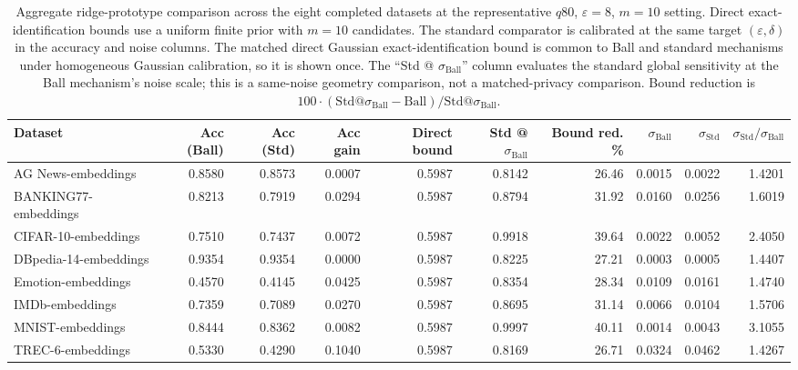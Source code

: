 \documentclass[conference,compsoc]{IEEEtran}
\begin{document}
\begin{table}[t]
\centering
\caption{Aggregate ridge-prototype comparison across the eight completed datasets at the representative $q80$, $\varepsilon=8$, $m=10$ setting. Direct exact-identification bounds use a uniform finite prior with $m=10$ candidates. The standard comparator is calibrated at the same target $(\varepsilon,\delta)$ in the accuracy and noise columns. The matched direct Gaussian exact-identification bound is common to Ball and standard mechanisms under homogeneous Gaussian calibration, so it is shown once. The ``Std @ $\sigma_{\mathrm{Ball}}$'' column evaluates the standard global sensitivity at the Ball mechanism's noise scale; this is a same-noise geometry comparison, not a matched-privacy comparison. Bound reduction is $100\cdot(\mathrm{Std@}\sigma_{\mathrm{Ball}}-\mathrm{Ball})/\mathrm{Std@}\sigma_{\mathrm{Ball}}$.}
\label{tab:aggregate-summary}
\scriptsize
\setlength{\tabcolsep}{3.5pt}
\begin{tabular}{lrrrrrrrrr}
\toprule
Dataset
& Acc (Ball)
& Acc (Std)
& Acc gain
& Direct bound
& Std @ $\sigma_{\mathrm{Ball}}$
& Bound red. \%
& $\sigma_{\mathrm{Ball}}$
& $\sigma_{\mathrm{Std}}$
& $\sigma_{\mathrm{Std}}/\sigma_{\mathrm{Ball}}$ \\
\midrule
AG News-embeddings          & 0.8580 & 0.8573 & 0.0007 & 0.5987 & 0.8142 & 26.46 & 0.0015 & 0.0022 & 1.4201 \\
BANKING77-embeddings        & 0.8213 & 0.7919 & 0.0294 & 0.5987 & 0.8794 & 31.92 & 0.0160 & 0.0256 & 1.6019 \\
CIFAR-10-embeddings         & 0.7510 & 0.7437 & 0.0072 & 0.5987 & 0.9918 & 39.64 & 0.0022 & 0.0052 & 2.4050 \\
DBpedia-14-embeddings       & 0.9354 & 0.9354 & 0.0000 & 0.5987 & 0.8225 & 27.21 & 0.0003 & 0.0005 & 1.4407 \\
Emotion-embeddings          & 0.4570 & 0.4145 & 0.0425 & 0.5987 & 0.8354 & 28.34 & 0.0109 & 0.0161 & 1.4740 \\
IMDb-embeddings             & 0.7359 & 0.7089 & 0.0270 & 0.5987 & 0.8695 & 31.14 & 0.0066 & 0.0104 & 1.5706 \\
MNIST-embeddings            & 0.8444 & 0.8362 & 0.0082 & 0.5987 & 0.9997 & 40.11 & 0.0014 & 0.0043 & 3.1055 \\
TREC-6-embeddings           & 0.5330 & 0.4290 & 0.1040 & 0.5987 & 0.8169 & 26.71 & 0.0324 & 0.0462 & 1.4267 \\
\bottomrule
\end{tabular}
\end{table}
\end{document}
